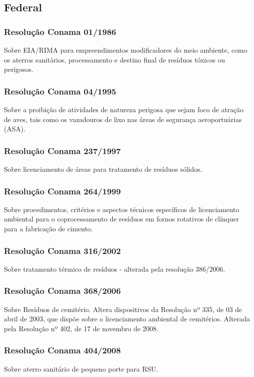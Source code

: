 \begin{subapend}
	\subsection{Federal}
	\begin{subsubapend}
		\item \subsubsection{Resolução Conama 01/1986}
		Sobre EIA/RIMA para empreendimentos modificadores do meio ambiente, como os aterros sanitários, processamento e destino final de resíduos tóxicos ou perigosos.
		\subsubsection{Resolução Conama 04/1995}
		Sobre a proibição de atividades de natureza perigosa que sejam foco de atração de aves, tais como os vazadouros de lixo nas áreas de segurança aeroportuárias (ASA).
		\subsubsection{Resolução Conama 237/1997}
		Sobre licenciamento de áreas para tratamento de resíduos sólidos.
		\subsubsection{Resolução Conama 264/1999}
		Sobre procedimentos, critérios e aspectos técnicos específicos de licenciamento ambiental para o coprocessamento de resíduos em fornos rotativos de clínquer para a fabricação de cimento.
		\subsubsection{Resolução Conama 316/2002}
		Sobre tratamento térmico de resíduos - alterada pela resolução 386/2006.
		\subsubsection{Resolução Conama 368/2006}
		Sobre Resíduos de cemitério. Altera dispositivos da Resolução nº 335, de 03 de abril de 2003, que dispõe sobre o licenciamento ambiental de cemitérios. Alterada pela Resolução nº 402, de 17 de novembro de 2008.
		\subsubsection{Resolução Conama 404/2008}
		Sobre aterro sanitário de pequeno porte para RSU.

\end{subsubapend}
\end{subapend}
